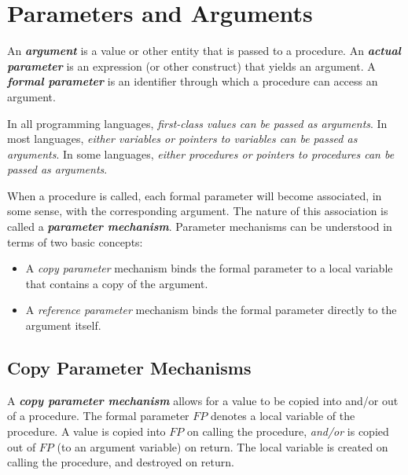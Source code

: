 \section{Parameters and Arguments}

An \textit{\textbf{argument}} is a value or other entity that is passed to a procedure. An \textit{\textbf{actual parameter}} is an expression (or other construct) that yields an argument. A \textit{\textbf{formal parameter}} is an identifier through which a procedure can access an argument.

In all programming languages, \textit{first-class values can be passed as arguments}. In most languages, \textit{either variables or pointers to variables can be passed as arguments}. In some languages, \textit{either procedures or pointers to procedures can be passed as arguments}.

When a procedure is called, each formal parameter will become associated, in some sense, with the corresponding argument. The nature of this association is called a \textit{\textbf{parameter mechanism}}. Parameter mechanisms can be understood in terms of two basic concepts:
\begin{itemize}
  \item A \textit{copy parameter} mechanism binds the formal parameter to a local variable that contains a copy of the argument.
  \item A \textit{reference parameter} mechanism binds the formal parameter directly to the argument itself.
\end{itemize}

\subsection{Copy Parameter Mechanisms}

A \textit{\textbf{copy parameter mechanism}} allows for a value to be copied into and/or out of a procedure. The formal parameter $FP$ denotes a local variable of the procedure. A value is copied into $FP$ on calling the procedure, \textit{and/or} is copied out of $FP$ (to an argument variable) on return. The local variable is created on calling the procedure, and destroyed on return.

